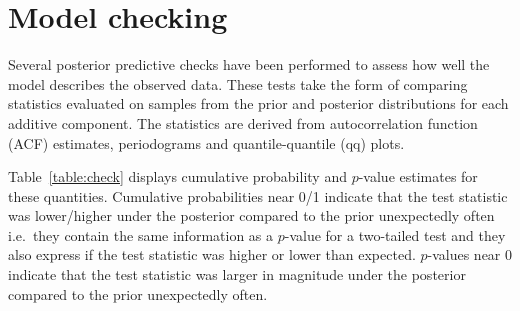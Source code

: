 \documentclass{article} %
\def\ie{i.e.\ }
\begin{document}
\section{Model checking}
\label{sec:check}

Several posterior predictive checks have been performed to assess how well the model describes the observed data.
These tests take the form of comparing statistics evaluated on samples from the prior and posterior distributions for each additive component.
The statistics are derived from autocorrelation function (ACF) estimates, periodograms and quantile-quantile (qq) plots.

Table~\ref{table:check} displays cumulative probability and $p$-value estimates for these quantities.
Cumulative probabilities near 0/1 indicate that the test statistic was lower/higher under the posterior compared to the prior unexpectedly often \ie they contain the same information as a $p$-value for a two-tailed test and they also express if the test statistic was higher or lower than expected.
$p$-values near 0 indicate that the test statistic was larger in magnitude under the posterior compared to the prior unexpectedly often.
\end{document}
